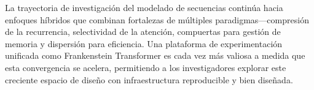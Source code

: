La trayectoria de investigación del modelado de secuencias continúa hacia enfoques híbridos que combinan fortalezas de múltiples paradigmas---compresión de la recurrencia, selectividad de la atención, compuertas para gestión de memoria y dispersión para eficiencia. Una plataforma de experimentación unificada como Frankenstein Transformer es cada vez más valiosa a medida que esta convergencia se acelera, permitiendo a los investigadores explorar este creciente espacio de diseño con infraestructura reproducible y bien diseñada.

